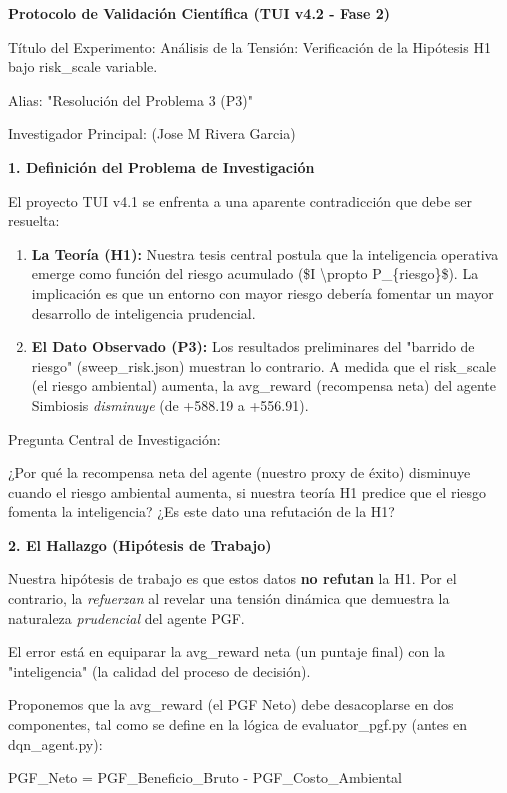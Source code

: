 \textbf{Protocolo de Validación Científica (TUI v4.2 - Fase 2)}

Título del Experimento: Análisis de la Tensión: Verificación de la
Hipótesis H1 bajo risk\_scale variable.

Alias: "Resolución del Problema 3 (P3)"

Investigador Principal: (Jose M Rivera Garcia)

\textbf{1. Definición del Problema de Investigación}

El proyecto TUI v4.1 se enfrenta a una aparente contradicción que debe
ser resuelta:

\begin{enumerate}
\def\labelenumi{\arabic{enumi}.}
\item
  \textbf{La Teoría (H1):} Nuestra tesis central postula que la
  inteligencia operativa emerge como función del riesgo acumulado (\$I
  \textbackslash propto P\_\{riesgo\}\$). La implicación es que un
  entorno con mayor riesgo debería fomentar un mayor desarrollo de
  inteligencia prudencial.
\item
  \textbf{El Dato Observado (P3):} Los resultados preliminares del
  "barrido de riesgo" (sweep\_risk.json) muestran lo contrario. A medida
  que el risk\_scale (el riesgo ambiental) aumenta, la avg\_reward
  (recompensa neta) del agente Simbiosis \emph{disminuye} (de +588.19 a
  +556.91).
\end{enumerate}

Pregunta Central de Investigación:

¿Por qué la recompensa neta del agente (nuestro proxy de éxito)
disminuye cuando el riesgo ambiental aumenta, si nuestra teoría H1
predice que el riesgo fomenta la inteligencia? ¿Es este dato una
refutación de la H1?

\textbf{2. El Hallazgo (Hipótesis de Trabajo)}

Nuestra hipótesis de trabajo es que estos datos \textbf{no refutan} la
H1. Por el contrario, la \emph{refuerzan} al revelar una tensión
dinámica que demuestra la naturaleza \emph{prudencial} del agente PGF.

El error está en equiparar la avg\_reward neta (un puntaje final) con la
"inteligencia" (la calidad del proceso de decisión).

Proponemos que la avg\_reward (el PGF Neto) debe desacoplarse en dos
componentes, tal como se define en la lógica de evaluator\_pgf.py (antes
en dqn\_agent.py):

PGF\_Neto = PGF\_Beneficio\_Bruto - PGF\_Costo\_Ambiental

